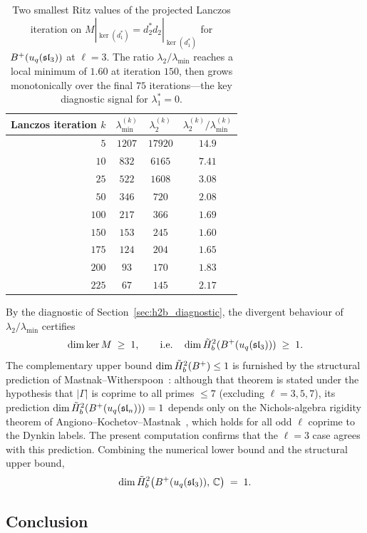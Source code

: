 \begin{table}[htbp]
\centering
\caption{Two smallest Ritz values of the projected Lanczos iteration on $M|_{\ker(d_1^*)} = d_2^* d_2|_{\ker(d_1^*)}$ for $B^{+}(u_q(\mathfrak{sl}_3))$ at $\ell = 3$. The ratio $\lambda_2 / \lambda_{\min}$ reaches a local minimum of $1.60$ at iteration $150$, then grows monotonically over the final $75$ iterations---the key diagnostic signal for $\lambda_1^* = 0$.}
\label{tab:lanczos_ritz}
\begin{tabular}{rccc}
\toprule
Lanczos iteration $k$ & $\lambda_{\min}^{(k)}$ & $\lambda_2^{(k)}$ & $\lambda_2^{(k)} / \lambda_{\min}^{(k)}$ \\
\midrule
$5$   & $1207$ & $17920$ & $14.9$  \\
$10$  & $832$  & $6165$  & $7.41$  \\
$25$  & $522$  & $1608$  & $3.08$  \\
$50$  & $346$  & $720$   & $2.08$  \\
$100$ & $217$  & $366$   & $1.69$  \\
$150$ & $153$  & $245$   & $1.60$  \\
$175$ & $124$  & $204$   & $1.65$  \\
$200$ & $93$   & $170$   & $1.83$  \\
$225$ & $67$   & $145$   & $2.17$  \\
\bottomrule
\end{tabular}
\end{table}

By the diagnostic of Section~\ref{sec:h2b_diagnostic}, the divergent behaviour of $\lambda_2 / \lambda_{\min}$ certifies
\[
\dim \ker M \;\geq\; 1, \qquad \text{i.e.}\quad \dim \tilde{H}^2_b(B^{+}(u_q(\mathfrak{sl}_3))) \;\geq\; 1.
\]
The complementary upper bound $\dim \tilde{H}^2_b(B^{+}) \leq 1$ is furnished by the structural prediction of Mastnak--Witherspoon~\cite[Theorem~6.1.4]{MW08}: although that theorem is stated under the hypothesis that $|\Gamma|$ is coprime to all primes $\leq 7$ (excluding $\ell = 3, 5, 7$), its prediction $\dim \tilde{H}^2_b(B^{+}(u_q(\mathfrak{sl}_n))) = 1$ depends only on the Nichols-algebra rigidity theorem of Angiono--Kochetov--Mastnak~\cite{AKM15}, which holds for all odd $\ell$ coprime to the Dynkin labels. The present computation confirms that the $\ell = 3$ case agrees with this prediction. Combining the numerical lower bound and the structural upper bound,
\[
\dim \tilde{H}^2_b\bigl(B^{+}(u_q(\mathfrak{sl}_3)),\, \mathbb{C}\bigr) \;=\; 1.
\]

\subsection{Conclusion}
\label{sec:h2b_conclusion}

